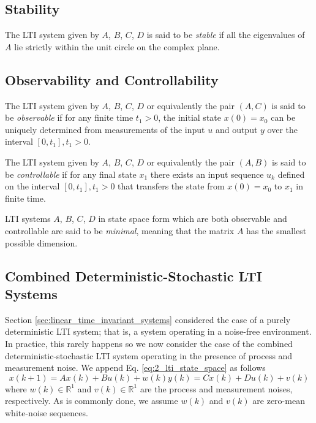 \subsection{Stability}
The LTI system given by $A$, $B$, $C$, $D$ is said to be \textit{stable} if all the eigenvalues of $A$ lie strictly within the unit circle on the complex plane.

\subsection{Observability and Controllability}
The LTI system given by $A$, $B$, $C$, $D$ or equivalently the pair $(A,C)$ is said to be \textit{observable} if for any finite time $t_1 > 0$, the initial state $x(0) = x_0$ can be uniquely determined from measurements of the input $u$ and output $y$ over the interval $[0, t_1], t_1>0$.

The LTI system given by $A$, $B$, $C$, $D$ or equivalently the pair $(A,B)$ is said to be \textit{controllable} if for any final state $x_1$ there exists an input sequence $u_k$ defined on the interval $[0, t_1], t_1>0$ that transfers the state from $x(0) = x_0$ to $x_1$ in finite time.

LTI systems $A$, $B$, $C$, $D$ in state space form which are both observable and controllable are said to be \textit{minimal}, meaning that the matrix $A$ has the smallest possible dimension.

\subsection{Combined Deterministic-Stochastic LTI Systems}
Section \ref{sec:linear_time_invariant_systems} considered the case of a purely deterministic LTI system; that is, a system operating in a noise-free environment. In practice, this rarely happens so we now consider the case of the combined deterministic-stochastic LTI system operating in the presence of process and measurement noise. We append Eq. \ref{eq:2_lti_state_space} as follows
\begin{subequations}\label{eq:2_lti_noise}
\begin{equation}x(k+1) = Ax(k) + Bu(k) + w(k)\end{equation}
\begin{equation}y(k) = Cx(k) + Du(k) + v(k)\end{equation}
\end{subequations}
where $w(k)\in\mathbb{R}^1$ and $v(k)\in\mathbb{R}^1$ are the process and measurement noises, respectively. As is commonly done, we assume $w(k)$ and $v(k)$ are zero-mean white-noise sequences. 

